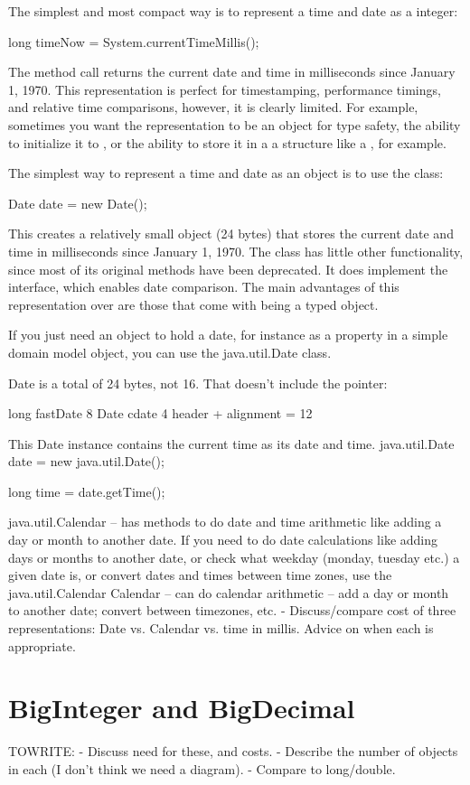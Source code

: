 The simplest and most compact way is to represent a time and date as a
 integer:
\begin{shortlisting}
    long timeNow = System.currentTimeMillis();
\end{shortlisting}
The method call  returns the current 
date and time in milliseconds since January 1, 1970.  This representation is
perfect for timestamping, performance timings, and relative time
comparisons, however, it is clearly limited. For example, sometimes you want the
representation to be an object for type safety, the ability to initialize it
to , or the ability to store it in a a structure like a
, for example.

The simplest way to represent a time and date as an object is to use the
 class:
\begin{shortlisting}
    Date date = new Date();
\end{shortlisting}
This creates a relatively small object (24 bytes) that stores the current date
and time in milliseconds since January 1, 1970. The class  has
little other functionality, since most of its original methods have been
deprecated. It does implement the  interface, which enables
date comparison. The main advantages of this representation over  are
those that come with being a typed object.



If you just need an object to hold a date, for instance as a property in a
simple domain model object, you can use the java.util.Date class.

Date is a total of 24 bytes, not 16.  That doesn't include the pointer:

long fastDate    8
Date cdate  4
header + alignment = 12 

This Date instance contains the current time as its date and time.
java.util.Date date = new java.util.Date();

long time = date.getTime(); 

java.util.Calendar -- has methods to do date and time arithmetic like adding a
day or
month to another date.
If you need to do date calculations like adding days or months to another date,
or check what weekday (monday, tuesday etc.) a given date is, or convert dates and times between time zones, use the java.util.Calendar Calendar -- can do calendar arithmetic -- add a day or
month to another date; convert between timezones, etc. - Discuss/compare cost of three representations:
Date vs. Calendar vs. time in millis.  Advice on when each is appropriate.

\section{BigInteger and BigDecimal}
TOWRITE:
- Discuss need for these, and costs.  - Describe the number of objects in each
(I don't think we need a diagram). - Compare to long/double.

